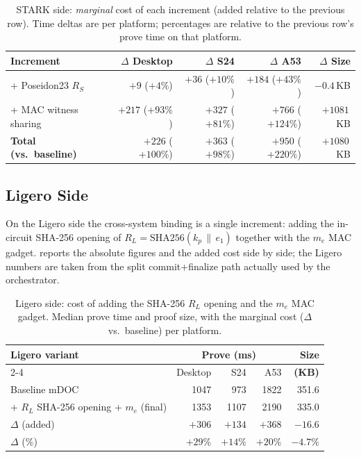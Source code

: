 \documentclass[binding=0.6cm,oneside,noexaminfo]{sapthesis}
\newcommand{\SHA}{\mathrm{SHA256}}
\begin{document}
\begin{table}[ht]
  \centering
  \caption{STARK side: \emph{marginal} cost of each increment (added relative to
  the previous row). Time deltas are per platform; percentages are relative to the
  previous row's prove time on that platform.}
  \label{tab:res-stark-delta}
  \small
  \begin{tabular}{@{}lrrrr@{}}
    \toprule
    \textbf{Increment} & \textbf{$\Delta$ Desktop} & \textbf{$\Delta$ S24} & \textbf{$\Delta$ A53} & \textbf{$\Delta$ Size} \\
    \midrule
    + Poseidon23 $R_S$        & $+9$ ($+4\%$)   & $+36$ ($+10\%$)  & $+184$ ($+43\%$)  & $-0.4$\,KB \\
    + MAC witness sharing     & $+217$ ($+93\%$)& $+327$ ($+81\%$) & $+766$ ($+124\%$) & $+1081$\,KB \\
    \midrule
    \textbf{Total (vs.\ baseline)} & $+226$ ($+100\%$) & $+363$ ($+98\%$) & $+950$ ($+220\%$) & $+1080$\,KB \\
    \bottomrule
  \end{tabular}
\end{table}

\subsection{Ligero Side}
\label{results:cust-ligero}
On the Ligero side the cross-system binding is a single increment: adding the
in-circuit SHA-256 opening of $R_L=\SHA(k_p\,\|\,e_1)$ together with the $m_e$ MAC
gadget.  reports the absolute figures and the added
cost side by side; the Ligero numbers are taken from the split commit+finalize
path actually used by the orchestrator.

\begin{table}[ht]
  \centering
  \caption{Ligero side: cost of adding the SHA-256 $R_L$ opening and the $m_e$ MAC
  gadget. Median prove time and proof size, with the marginal cost
  ($\Delta$ vs.\ baseline) per platform.}
  \label{tab:res-ligero-steps}
  \small
  \begin{tabular}{@{}lrrrr@{}}
    \toprule
    \textbf{Ligero variant} & \multicolumn{3}{c}{\textbf{Prove (ms)}} & \textbf{Size} \\
    \cmidrule(lr){2-4}
     & Desktop & S24 & A53 & \textbf{(KB)} \\
    \midrule
    Baseline mDOC                                & 1047 & 973  & 1822 & 351.6 \\
    \;+ $R_L$ SHA-256 opening + $m_e$ (final)    & 1353 & 1107 & 2190 & 335.0 \\
    \midrule
    $\Delta$ (added)                             & $+306$ & $+134$ & $+368$ & $-16.6$ \\
    $\Delta$ (\%)                                & $+29\%$ & $+14\%$ & $+20\%$ & $-4.7\%$ \\
    \bottomrule
  \end{tabular}
\end{table}
\end{document}
